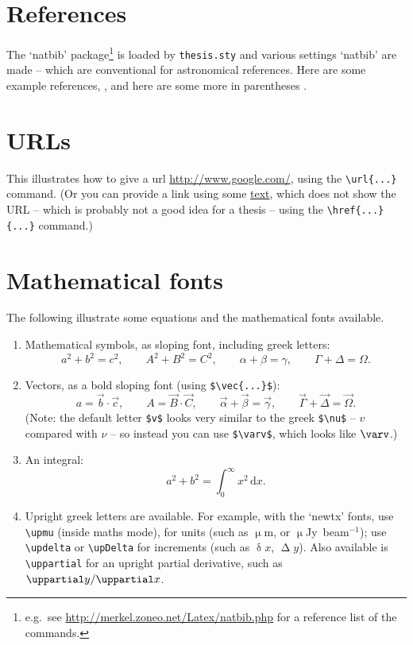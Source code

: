 \section{References}

The `natbib' package\footnote{e.g.\ see
\url{http://merkel.zoneo.net/Latex/natbib.php} for a reference list of
the commands.} is loaded by \verb|thesis.sty| and various settings
`natbib' are made -- which are conventional for astronomical references.
Here are some example references, \citet{1971QJRAS..12...10S,
2002ISAA....5.....S, 2003JAHH....6...46S}, and here are some more in
parentheses \citep{2005JHA....36..217S, 2009JHA....40...31S}.

\section{URLs}

This illustrates how to give a url \url{http://www.google.com/}, using
the \verb|\url{...}| command. (Or you can provide a link using some
\href{http://www.google.com/}{text}, which does not show the URL --
which is probably not a good idea for a thesis -- using the
\verb|\href{...}{...}| command.)

\section{Mathematical fonts}\label{s:mathsfonts}

The following illustrate some equations and the mathematical fonts
available.
%
\begin{enumerate}
%
\item Mathematical symbols, as sloping font, including greek letters:
$$
  a^2 + b^2 = c^2, \qquad
  A^2 + B^2 = C^2, \qquad
  \alpha + \beta = \gamma, \qquad
  \Gamma + \Delta = \Omega.
$$
\item Vectors, as a bold sloping font (using \verb|$\vec{...}$|):
$$
  a = \vec{b} \cdot \vec{c}, \qquad
  A = \vec{B} \cdot \vec{C}, \qquad
  \vec{\alpha} + \vec{\beta} = \vec{\gamma}, \qquad
  \vec{\Gamma} + \vec{\Delta} = \vec{\Omega}.
$$
(Note: the default letter \verb|$v$| looks
very similar to the greek \verb|$\nu$| -- $v$ compared with $\nu$ -- so
instead you can use \verb|$\varv$|, which looks like $\varv$.)
%
\item An integral:
$$
 a^2 + b^2 = \int_0^\infty x^2 \, \text{d}x.
$$
\item Upright greek letters are available. For example, with the `newtx'
fonts, use \verb|\upmu| (inside maths mode), for units (such as
$\upmu$m, or $\upmu$Jy~beam$^{-1}$); use \verb|\updelta| or
\verb|\upDelta| for increments (such as $\updelta x$, $\upDelta y$).
Also available is \verb|\uppartial| for an upright partial derivative,
such as $\uppartial y/\uppartial x$.
%
\end{enumerate}

